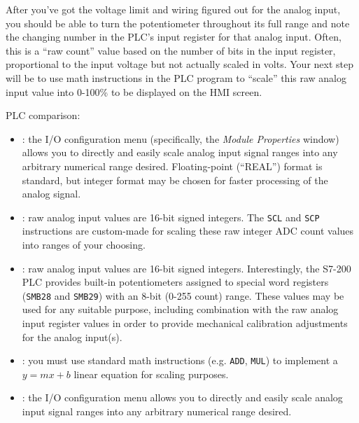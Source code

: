 \documentclass[12pt,a4paper]{article}
\begin{document}
\vskip 10pt

After you've got the voltage limit and wiring figured out for the analog input, you should be able to turn the potentiometer throughout its full range and note the changing number in the PLC's input register for that analog input.  Often, this is a ``raw count'' value based on the number of bits in the input register, proportional to the input voltage but not actually scaled in volts.  Your next step will be to use math instructions in the PLC program to ``scale'' this raw analog input value into 0-100\% to be displayed on the HMI screen.

\vfil 

\noindent
PLC comparison:

\begin{itemize}
\item{} : the I/O configuration menu (specifically, the {\it Module Properties} window) allows you to directly and easily scale analog input signal ranges into any arbitrary numerical range desired.  Floating-point (``REAL'') format is standard, but integer format may be chosen for faster processing of the analog signal.
\vskip 5pt
\item{} : raw analog input values are 16-bit signed integers.  The {\tt SCL} and {\tt SCP} instructions are custom-made for scaling these raw integer ADC count values into ranges of your choosing.
\vskip 5pt
\item{} : raw analog input values are 16-bit signed integers.  Interestingly, the S7-200 PLC provides built-in potentiometers assigned to special word registers ({\tt SMB28} and {\tt SMB29}) with an 8-bit (0-255 count) range.  These values may be used for any suitable purpose, including combination with the raw analog input register values in order to provide mechanical calibration adjustments for the analog input(s).
\vskip 5pt
\item{} : you must use standard math instructions (e.g. {\tt ADD}, {\tt MUL}) to implement a $y = mx + b$ linear equation for scaling purposes.
\vskip 5pt
\item{} : the I/O configuration menu allows you to directly and easily scale analog input signal ranges into any arbitrary numerical range desired.
\end{itemize}

\eject
\vskip 10pt \filbreak 
\end{document}
